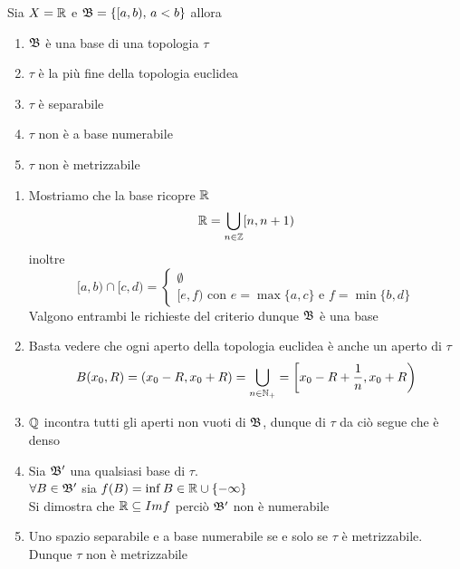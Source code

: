 Sia $X=\mathbb{R}$ e $\mathfrak{B}=\{ [a,b) , \, a<b \}$ allora
\begin{enumerate}
\item $\mathfrak{B}$ \`e una base di una topologia $\tau$ 
\item $\tau$ \`e la pi\`u fine della topologia euclidea
\item $\tau$ \`e separabile
\item $\tau$ non \`e a base numerabile
\item $\tau$ non \`e metrizzabile
\end{enumerate}
\begin{enumerate}
\item Mostriamo che la base ricopre $\mathbb{R}$ 
$$ \mathbb{R} = \bigcup_{n \in \mathbb{Z}} [n , n+1)$$
inoltre 
$$ [a,b) \cap [c,d) =\begin{cases} \emptyset \\
[e,f) \text{ con } e=\max \{ a,c \} \text{ e } f = \min \{ b ,d \} 
\end{cases}$$
Valgono entrambi le richieste del criterio dunque $\mathfrak{B}$ \`e una base
\item Basta vedere che ogni aperto della topologia euclidea \`e anche un aperto di $\tau$
$$ B(x_0,R)= (x_0-R, x_0+R) = \bigcup_{n \in \mathbb{N}_+}=\left[ x_0-R+\frac{1}{n}, x_0+R \right) $$
\item $\mathbb{Q}$ incontra tutti gli aperti non vuoti di $\mathfrak{B}$, dunque di $\tau$ da ci\`o segue che \`e denso 
\item Sia $\mathfrak{B}'$ una qualsiasi base di $\tau$.\\
$\forall	 B \in \mathfrak{B}' $ sia $f(B)=\inf B \in \mathbb{R} \cup \{ - \infty \} $\\
Si dimostra che $\mathbb{R} \subseteq Im f $ perci\`o $\mathfrak{B}'$ non \`e numerabile
\item Uno spazio separabile e a base numerabile se e solo se $\tau$ \`e metrizzabile. Dunque $\tau$ non \`e metrizzabile
\end{enumerate}
\newpage






